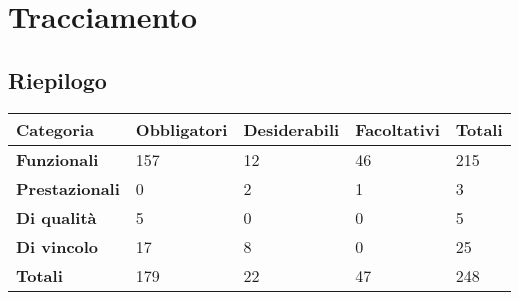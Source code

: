%


\section{Tracciamento} %
\label{sec:tracciamento}
	
	


\subsection{Riepilogo}

\begin{center}

	\def\arraystretch{1.5}
	\bgroup
	\begin{longtable}{| p{2.7cm} | p{2.4cm} | p{2.4cm} | p{2.4cm} | p{1.7cm} |}

		\hline
		\textbf{Categoria} & \textbf{Obbligatori} & \textbf{Desiderabili} & \textbf{Facoltativi} & \textbf{Totali} \\
		\hline

		\textbf{Funzionali}  & 157 & 12 & 46 & 215 \\
		\hline
		\textbf{Prestazionali} & 0 & 2 & 1 & 3 \\
		\hline
		\textbf{Di qualità} & 5 & 0 & 0 & 5 \\
		\hline
		\textbf{Di vincolo} & 17 & 8 & 0 & 25 \\
		\hline
		\textbf{Totali}  & 179 & 22 & 47 & 248 \\
		\hline
	\end{longtable}
	\egroup
\end{center}

